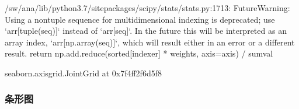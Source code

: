 \documentclass[letterpaper,10pt,english]{sphinxhowto}
\begin{document}
%
\begin{sphinxVerbatim}[commandchars=\\\{\}]
   
\end{sphinxVerbatim}

%
\begin{sphinxVerbatim}[commandchars=\\\{\}]
/sw/ana/lib/python3.7/site\PYGZhy{}packages/scipy/stats/stats.py:1713: FutureWarning: Using a non\PYGZhy{}tuple sequence for multidimensional indexing is deprecated; use {}`arr[tuple(seq)]{}` instead of {}`arr[seq]{}`. In the future this will be interpreted as an array index, {}`arr[np.array(seq)]{}`, which will result either in an error or a different result.
  return np.add.reduce(sorted[indexer] * weights, axis=axis) / sumval





\PYGZlt{}seaborn.axisgrid.JointGrid at 0x7f4ff2f6d5f8\PYGZgt{}
\end{sphinxVerbatim}



\subsubsection{条形图}
\label{\detokenize{Seaborn_u6570_u636e_u53ef_u89c6_u5316:id6}}
%
\begin{sphinxVerbatim}[commandchars=\\\{\}]
  
\end{sphinxVerbatim}



%
\begin{sphinxVerbatim}[commandchars=\\\{\}]
    
     

   
     
\end{sphinxVerbatim}
\end{document}
